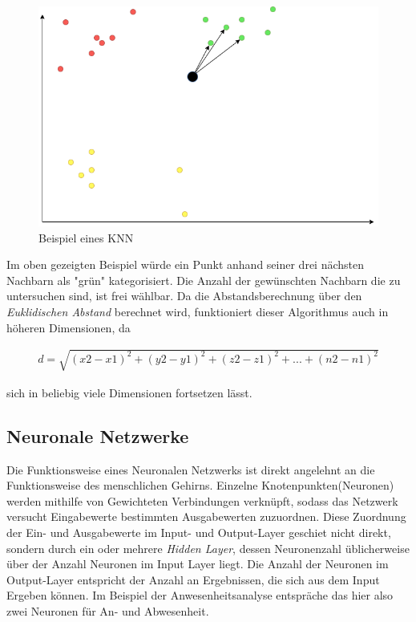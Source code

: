\begin{figure}[h]
    \centering
    \includegraphics[width=12.0cm]{pic/KNN.png}
    \caption{Beispiel eines KNN}
    \label{fig:NN}
\end{figure}

Im oben gezeigten Beispiel würde ein Punkt anhand seiner drei nächsten Nachbarn als "grün" kategorisiert.
Die Anzahl der gewünschten Nachbarn die zu untersuchen sind, ist frei wählbar. \newpage
Da die Abstandsberechnung über den \textit{Euklidischen Abstand} berechnet wird, funktioniert dieser 
Algorithmus auch in höheren Dimensionen, da 

\begin{align}
    d = \sqrt{(x2 - x1)^2 + (y2 - y1)^2 + (z2 - z1)^2 + ... + (n2 - n1)^2}
\end{align}

sich in beliebig viele Dimensionen fortsetzen lässt.

\subsection{Neuronale Netzwerke}
Die Funktionsweise eines Neuronalen Netzwerks ist direkt angelehnt an die Funktionsweise des menschlichen Gehirns.
Einzelne Knotenpunkten(Neuronen) werden mithilfe von Gewichteten Verbindungen verknüpft, sodass das Netzwerk versucht 
Eingabewerte bestimmten Ausgabewerten zuzuordnen. Diese Zuordnung der Ein- und Ausgabewerte im Input- und Output-Layer 
geschiet nicht direkt, sondern durch ein oder mehrere \textit{Hidden Layer}, dessen Neuronenzahl üblicherweise über 
der Anzahl Neuronen im Input Layer liegt. Die Anzahl der Neuronen im Output-Layer entspricht der Anzahl an Ergebnissen, 
die sich aus dem Input Ergeben können. Im Beispiel der Anwesenheitsanalyse entspräche das hier also zwei Neuronen für 
An- und Abwesenheit.

